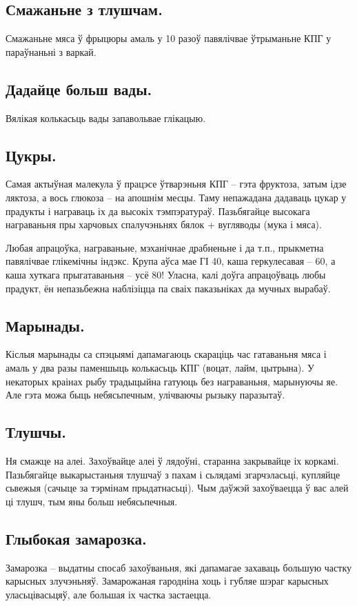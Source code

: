 \subsection{Смажаньне з тлушчам.}
Смажаньне мяса ў фрыцюры амаль у 10 разоў павялічвае ўтрыманьне КПГ у параўнаньні з варкай.

\subsection{Дадайце больш вады.}
Вялікая колькасьць вады запавольвае глікацыю.

\subsection{Цукры.}
Самая актыўная малекула ў працэсе ўтварэньня КПГ – гэта фруктоза, затым ідзе ляктоза, а вось глюкоза – на апошнім месцы. Таму непажадана дадаваць цукар у прадукты і награваць іх да высокіх тэмпэратураў. Пазьбягайце высокага награваньня пры харчовых спалучэньнях бялок + вугляводы (мука і мяса).

Любая апрацоўка, награваньне, мэханічнае драбненьне і да т.п., прыкметна павялічвае глікемічны індэкс. Крупа аўса мае ГІ 40, каша геркулесавая – 60, а каша хуткага прыгатаваньня – усё 80! Уласна, калі доўга апрацоўваць любы прадукт, ён непазьбежна наблізіцца па сваіх паказьніках да мучных вырабаў.

\subsection{Марынады.}
Кіслыя марынады са спэцыямі дапамагаюць скараціць час гатаваньня мяса і амаль у два разы паменшыць колькасьць КПГ (воцат, лайм, цытрына). У некаторых краінах рыбу традыцыйна гатуюць без награваньня, марынуючы яе. Але гэта можа быць небясьпечным, улічваючы рызыку паразытаў.

\subsection{Тлушчы.}
Ня смажце на алеі. Захоўвайце алеі ў лядоўні, старанна закрывайце іх коркамі. Пазьбягайце выкарыстаньня тлушчаў з пахам і сьлядамі згарчэласьці, купляйце сьвежыя (сачыце за тэрмінам прыдатнасьці). Чым даўжэй захоўваецца ў вас алей ці тлушч, тым яны больш небясьпечныя.

\subsection{Глыбокая замарозка.}
Замарозка – выдатны спосаб захоўваньня, які дапамагае захаваць большую частку карысных злучэньняў. Замарожаная гародніна хоць і губляе шэраг карысных уласьцівасьцяў, але большая іх частка застаецца.

